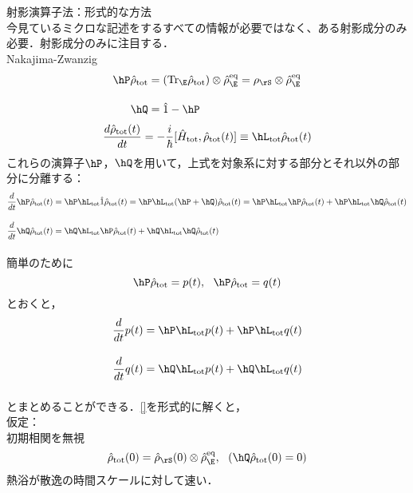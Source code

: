 \section{}
射影演算子法：形式的な方法\\
今見ているミクロな記述をするすべての情報が必要ではなく、ある射影成分のみ必要．射影成分のみに注目する．\\
Nakajima-Zwanzig
\begin{align}
    \hP\hrho_{\tot}&=(\tr_{\E}\hrho_{\tot})\otimes\hrho_{\E}^{\rm{eq}}
    =\rho_{\rS}\otimes\hrho_{\E}^{\rm{eq}}\\[10pt]
    \hQ&=\hat{1}-\hP
\end{align}
\begin{equation}
    \frac{d\hrho_{\tot}(t)}{dt}
    =-\frac{i}{\hbar}[\hH_{\tot},\hrho_{\tot}(t)]\equiv\hL_{\tot}\hrho_{\tot}(t)
\end{equation}
これらの演算子$\hP$，$\hQ$を用いて，上式を対象系に対する部分とそれ以外の部分に分離する：
\begin{align}
   \frac{d}{dt}\hP\hrho_{\tot}(t)
    &=\hP\hL_{\tot}\hat{1}\hrho_{\tot}(t)=\hP\hL_{\tot}(\hP+\hQ)\hrho_{\tot}(t)
    =\hP\hL_{\tot}\hP\hrho_{\tot}(t)+\hP\hL_{\tot}\hQ\hrho_{\tot}(t)\\[10pt]
    \frac{d}{dt}\hQ\hrho_{\tot}(t)
    &=\hQ\hL_{\tot}\hP\hrho_{\tot}(t)+\hQ\hL_{\tot}\hQ\hrho_{\tot}(t)\\[10pt]
\end{align}
簡単のために
\begin{equation}
    \hP\hrho_{\tot}=p(t),\ \ \hP\hrho_{\tot}=q(t) 
\end{equation}
とおくと，
\begin{align}
   \frac{d}{dt}p(t)
    &=\hP\hL_{\tot}p(t)+\hP\hL_{\tot}q(t)\\[10pt]
    \frac{d}{dt}q(t)
    &=\hQ\hL_{\tot}p(t)+\hQ\hL_{\tot}q(t)\\[10pt]
\end{align}
とまとめることができる．\eqref{}を形式的に解くと，
\begin{equation}
\end{equation}
仮定：\\
初期相関を無視
\begin{equation}
    \hrho_{\tot}(0)=\hrho_{\rS}(0)\otimes\hrho_{\E}^{\rm{eq}},\ \ (\hQ\hrho_{\tot}(0)=0)
\end{equation}
熱浴が散逸の時間スケールに対して速い．



